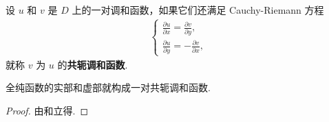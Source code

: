 \documentclass[../../main.tex]{subfiles}%
\begin{document}
\begin{definition}[共轭调和函数]
设 $u$ 和 $v$ 是 $D$ 上的一对调和函数，如果它们还满足 Cauchy-Riemann 方程
\begin{align}
\begin{cases} 
\displaystyle \frac{\partial u}{\partial x} = \frac{\partial v}{\partial y}, \\
\displaystyle \frac{\partial u}{\partial y} = -\frac{\partial v}{\partial x},
\end{cases} \label{eq:2.2.10}
\end{align}
就称 $v$ 为 $u$ 的\textbf{共轭调和函数}.
\end{definition}

\begin{proposition}
全纯函数的实部和虚部就构成一对共轭调和函数.
\end{proposition}
\begin{proof}
由和立得.
\end{proof}
\end{document}
